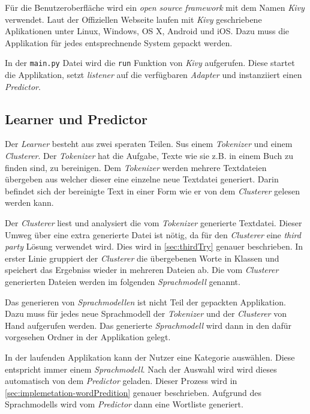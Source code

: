         Für die Benutzeroberfläche wird ein \emph{open source framework} mit dem Namen \emph{Kivy} verwendet. Laut der Offiziellen Webseite \parencite{kivy:homepage} laufen mit \emph{Kivy} geschriebene Aplikationen unter Linux, Windows, OS X, Android und iOS. Dazu muss die Applikation für jedes entsprechnende System gepackt werden.
        
        In der \texttt{main.py} Datei wird die \texttt{run} Funktion von \emph{Kivy} aufgerufen. Diese startet die Applikation, setzt \emph{listener} auf die verfügbaren \emph{Adapter} und instanziiert einen \emph{Predictor}.
        
	\subsection{Learner und Predictor}
    
    	Der \emph{Learner} besteht aus zwei speraten Teilen. Sus einem \emph{Tokenizer} und einem \emph{Clusterer}. Der \emph{Tokenizer} hat die Aufgabe, Texte wie sie z.B. in einem Buch zu finden sind, zu bereinigen. Dem \emph{Tokenizer} werden mehrere Textdateien übergeben aus welcher dieser eine einzelne neue Textdatei generiert. Darin befindet sich der bereinigte Text in einer Form wie er von dem \emph{Clusterer} gelesen werden kann.

		Der \emph{Clusterer} liest und analysiert die vom \emph{Tokenizer} generierte Textdatei. Dieser Umweg über eine extra generierte Datei ist nötig, da für den \emph{Clusterer} eine \emph{third party} Lösung verwendet wird. Dies wird in \autoref{sec:thirdTry} genauer beschrieben. In erster Linie gruppiert der \emph{Clusterer} die übergebenen Worte in Klassen und speichert das Ergebniss wieder in mehreren Dateien ab. Die vom \emph{Clusterer} generierten Dateien werden im folgenden \emph{Sprachmodell} genannt.

		Das generieren von \emph{Sprachmodellen} ist nicht Teil der gepackten Applikation. Dazu muss für jedes neue Sprachmodell der \emph{Tokenizer} und der \emph{Clusterer} von Hand aufgerufen werden. Das generierte \emph{Sprachmodell} wird dann in den dafür vorgesehen Ordner in der Applikation gelegt.

		In der laufenden Applikation kann der Nutzer eine Kategorie auswählen. Diese entspricht immer einem \emph{Sprachmodell}. Nach der Auswahl wird wird dieses automatisch von dem \emph{Predictor} geladen. Dieser Prozess wird in \autoref{sec:implemetation-wordPredition} genauer beschrieben. Aufgrund des Sprachmodells wird vom \emph{Predictor} dann eine Wortliste generiert.
        
